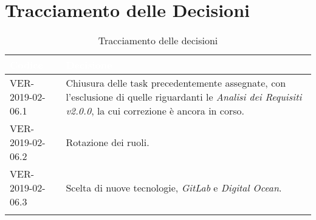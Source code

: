 
\section{Tracciamento delle Decisioni}

\begin{longtable}{|C{.40\textwidth}|C{.60\textwidth}|}
\hline
{}\textbf{\textcolor{white}{Codice}} & \textbf{\textcolor{white}{Decisione}}\\
\hline
VER-2019-02-06.1 & Chiusura delle task precedentemente assegnate, con l'esclusione di quelle riguardanti le \textit{Analisi dei Requisiti v2.0.0}, la cui correzione è ancora in corso.\\
\hline
{}VER-2019-02-06.2 & Rotazione dei ruoli. \\
\hline
VER-2019-02-06.3 & Scelta di nuove tecnologie, \textit{GitLab} e \textit{Digital Ocean}. \\
\hline

\caption{Tracciamento delle decisioni}
\end{longtable}


